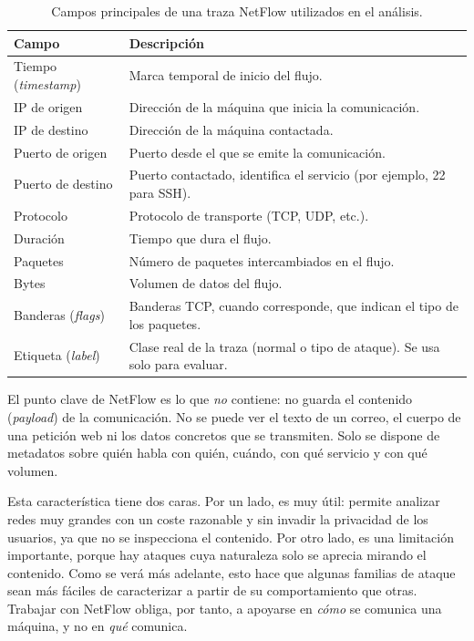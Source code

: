 \begin{table}[!htbp]
\centering
\small
\begin{tabular}{|l|p{8.5cm}|}
\hline
\textbf{Campo} & \textbf{Descripción} \\
\hline
Tiempo (\emph{timestamp}) & Marca temporal de inicio del flujo. \\
\hline
IP de origen & Dirección de la máquina que inicia la comunicación. \\
\hline
IP de destino & Dirección de la máquina contactada. \\
\hline
Puerto de origen & Puerto desde el que se emite la comunicación. \\
\hline
Puerto de destino & Puerto contactado, identifica el servicio (por ejemplo, 22 para SSH). \\
\hline
Protocolo & Protocolo de transporte (TCP, UDP, etc.). \\
\hline
Duración & Tiempo que dura el flujo. \\
\hline
Paquetes & Número de paquetes intercambiados en el flujo. \\
\hline
Bytes & Volumen de datos del flujo. \\
\hline
Banderas (\emph{flags}) & Banderas TCP, cuando corresponde, que indican el tipo de los paquetes. \\
\hline
Etiqueta (\emph{label}) & Clase real de la traza (normal o tipo de ataque). Se usa solo para evaluar. \\
\hline
\end{tabular}
\caption{Campos principales de una traza NetFlow utilizados en el análisis.}
\label{tab:campos_netflow}
\end{table}

El punto clave de NetFlow es lo que \emph{no} contiene: no guarda el contenido (\emph{payload}) de la comunicación. No se puede ver el texto de un correo, el cuerpo de una petición web ni los datos concretos que se transmiten. Solo se dispone de metadatos sobre quién habla con quién, cuándo, con qué servicio y con qué volumen.

Esta característica tiene dos caras. Por un lado, es muy útil: permite analizar redes muy grandes con un coste razonable y sin invadir la privacidad de los usuarios, ya que no se inspecciona el contenido. Por otro lado, es una limitación importante, porque hay ataques cuya naturaleza solo se aprecia mirando el contenido. Como se verá más adelante, esto hace que algunas familias de ataque sean más fáciles de caracterizar a partir de su comportamiento que otras. Trabajar con NetFlow obliga, por tanto, a apoyarse en \emph{cómo} se comunica una máquina, y no en \emph{qué} comunica.

